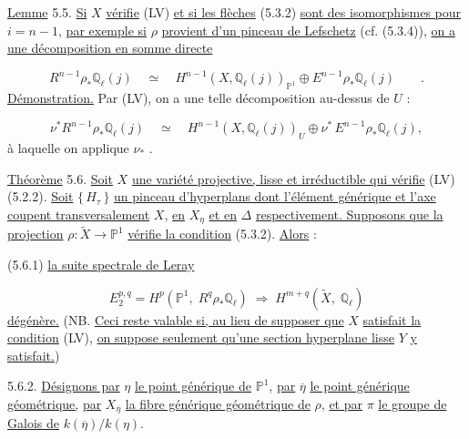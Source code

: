 \underline{Lemme} 5.5. \underline{Si} $X$ \underline{vérifie} (LV) \underline{et si les flèches} (5.3.2) \underline{sont des isomorphismes pour} $i = n - 1$, \underline{par exemple si} $\rho$ \underline{provient d'un pinceau de Lefschetz} (cf. (5.3.4)), \underline{on a une décomposition en somme directe}

\begin{equation}\tag{5.5.1}
R^{n-1}\rho_*\mathbb{Q}_\ell(j) \quad \simeq \quad H^{n-1}(X,\mathbb{Q}_\ell(j))_{\mathbb{P}^1} \oplus E^{n-1}\rho_*\mathbb{Q}_\ell(j) \qquad .
\end{equation}
\underline{Démonstration.} Par (LV), on a une telle décomposition au-dessus de $U$ :

\begin{equation}\tag{5.5.2}
\nu^*R^{n-1}\rho_*\mathbb{Q}_\ell(j) \quad \simeq \quad H^{n-1}(X,\mathbb{Q}_\ell(j))_U \oplus \nu^*\, E^{n-1}\rho_*\mathbb{Q}_\ell(j),
\end{equation}
à laquelle on applique $\nu_*$ .

\underline{Théorème} 5.6. \underline{Soit} $X$ \underline{une variété projective, lisse et irréductible qui vérifie} (LV) (5.2.2). \underline{Soit} $\{\, H_\tau \,\}$ \underline{un pinceau d'hyperplans dont l'élément générique et l'axe coupent transversalement} $X$, \underline{en} $X_\eta$ \underline{et en} $\Delta$ \underline{respectivement. Supposons que la projection} $\rho : \widetilde{X} \longrightarrow \mathbb{P}^1$ \underline{vérifie la condition} (5.3.2). \underline{Alors} :

(5.6.1) \quad \underline{la suite spectrale de Leray}

\begin{equation*}
E_2^{p,q} = H^p(\mathbb{P}^1,\; R^q\rho_*\mathbb{Q}_\ell) \;\Longrightarrow\; H^{m+q}(\widetilde{X},\; \mathbb{Q}_\ell)
\end{equation*}
\underline{dégénère.} (NB. \underline{Ceci reste valable si, au lieu de supposer que} $X$ \underline{satisfait la condition} (LV), \underline{on suppose seulement qu'une section hyperplane lisse} $Y$ \underline{y satisfait.})



5.6.2. \underline{Désignons par} $\eta$ \underline{le point générique de} $\mathbb{P}^1$, \underline{par} $\overline{\eta}$ \underline{le point générique géométrique,} \underline{par} $X_{\overline{\eta}}$ \underline{la fibre générique géométrique de} $\rho$, \underline{et par} $\pi$ \underline{le groupe de Galois de} $k(\overline{\eta})/k(\eta)$.

